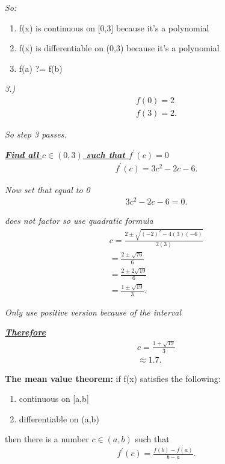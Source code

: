 \documentclass{report}
\begin{document}
   \bigbreak \noindent
   \textit{So:}
   \begin{enumerate}
     \item f(x) is continuous on [0,3] because it's a polynomial
      \item f(x) is differentiable on (0,3) because it's a polynomial
      \item f(a) ?= f(b)
   \end{enumerate}

   \bigbreak \noindent 
   \textit{3.)}
   \begin{align*}
     f(0) = 2 \\
      f(3) = 2
   .\end{align*}

   \bigbreak \noindent 
   \textit{So step 3 passes.}

   \bigbreak \noindent 
   \textbf{\textit{\underline{Find all $c \in (0,3) $ such that $f^{\prime}(c) = 0$}}}
   \begin{align*}
     f^{\prime}(c) = 3c^{2} - 2c - 6 
   .\end{align*}

   \bigbreak \noindent 
   \textit{Now set that equal to 0}
   \begin{align*}
     3c^{2} -2c - 6 = 0
   .\end{align*}

   \bigbreak \noindent 
   \textit{does not factor so use quadratic formula}
   \begin{align*}
     c = \frac{2\pm\sqrt{(-2)^{2} - 4(3)(-6)}}{2(3)} \\
     =\frac{2\pm\sqrt{76}}{6} \\
     = \frac{2\pm 2\sqrt{19}}{6} \\
     = \frac{1\pm \sqrt{19}}{3}
   .\end{align*}

   \bigbreak \noindent 
   \textit{Only use positive version because of the interval}

   \bigbreak \noindent 
   \textbf{\textit{\underline{Therefore}}}
   \begin{align*}
     c = \frac{1+\sqrt{19}}{3}\\
     \approx 1.7
   .\end{align*}

   \bigbreak \noindent 
   \begin{mdframed}
     \textbf{The mean value theorem:}
     \bigbreak \noindent 
     if f(x) satisfies the following:
     \begin{enumerate}
       \item continuous on [a,b]
        \item differentiable on (a,b)
     \end{enumerate}
     \smallbreak \noindent
     then there is a number $c \in (a,b)$ such that
     \begin{align*}
       f^{\prime}(c) = \frac{f(b) - f(a)}{b -a}
     .\end{align*}
   \end{mdframed}
\end{document}
